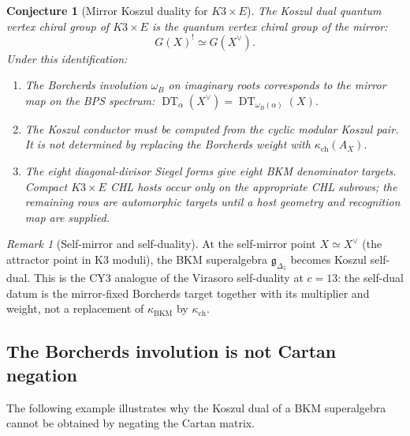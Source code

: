 \documentclass[11pt]{article}
\newtheorem{conjecture}[theorem]{Conjecture}
\theoremstyle{definition}
\theoremstyle{remark}
\newtheorem{remark}[theorem]{Remark}
\DeclareMathOperator{\DT}{DT}
\newcommand{\fkg}{\mathfrak{g}}
\begin{document}
\begin{conjecture}[Mirror Koszul duality for $K3 \times E$]
\label{conj:k3e-mirror-koszul}
The Koszul dual quantum vertex chiral group of $K3 \times E$ is
the quantum vertex chiral group of the mirror:
\[
G(X)^! \simeq G(X^\vee).
\]
Under this identification:
\begin{enumerate}[label=(\roman*)]
\item The Borcherds involution $\omega_B$ on imaginary roots
corresponds to the mirror map on the BPS spectrum:
$\DT_\alpha(X^\vee) = \DT_{\omega_B(\alpha)}(X)$.
\item The Koszul conductor must be computed from the cyclic modular
Koszul pair. It is not determined by replacing the Borcherds weight
with $\kappa_{\mathrm{ch}}(A_X)$.
\item The eight diagonal-divisor Siegel forms give eight BKM
denominator targets. Compact $K3\times E$ CHL hosts occur only on the
appropriate CHL subrows; the remaining rows are automorphic targets
until a host geometry and recognition map are supplied.
\end{enumerate}
\end{conjecture}

\begin{remark}[Self-mirror and self-duality]
At the self-mirror point $X \simeq X^\vee$ (the attractor point in
K3 moduli), the BKM superalgebra $\fkg_{\Delta_5}$ becomes Koszul
self-dual. This is the CY3 analogue of the Virasoro self-duality at
$c = 13$: the self-dual datum is the mirror-fixed Borcherds target
together with its multiplier and weight, not a replacement of
$\kappa_{\mathrm{BKM}}$ by $\kappa_{\mathrm{ch}}$.
\end{remark}

\subsection{The Borcherds involution is not Cartan negation}

The following example illustrates why the Koszul dual of a BKM
superalgebra cannot be obtained by negating the Cartan matrix.
\end{document}
